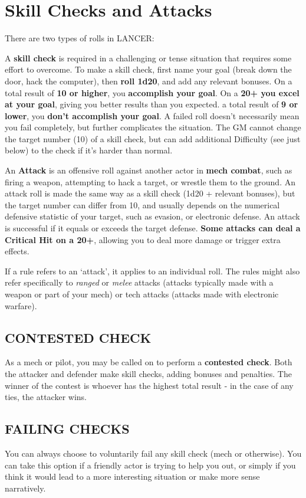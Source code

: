 \section{Skill Checks and Attacks}

There are two types of rolls in LANCER:

A \textbf{skill check} is required in a challenging or tense situation that requires some effort to
overcome. To make a skill check, first name your goal (break down the door, hack the computer),
then \textbf{roll 1d20}, and add any relevant bonuses. On a total result of \textbf{10 or higher}, you \textbf{accomplish
your goal}. On a \textbf{20+ you excel at your goal}, giving you better results than you expected. a total
result of \textbf{9 or lower}, you \textbf{don’t accomplish your goal}. A failed roll doesn’t necessarily mean you
fail completely, but further complicates the situation. The GM cannot change the target number
(10) of a skill check, but can add additional Difficulty (see just below) to the check if it’s harder
than normal.

An \textbf{Attack} is an offensive roll against another actor in \textbf{mech combat}, such as firing a weapon,
attempting to hack a target, or wrestle them to the ground. An attack roll is made the same way
as a skill check (1d20 + relevant bonuses), but the target number can differ from 10, and usually
depends on the numerical defensive statistic of your target, such as evasion, or electronic
defense. An attack is successful if it equals or exceeds the target defense. \textbf{Some attacks can
deal a Critical Hit on a 20+}, allowing you to deal more damage or trigger extra effects.

If a rule refers to an ‘attack’, it applies to an individual roll. The rules might also refer specifically
to \textit{ranged} or \textit{melee} attacks (attacks typically made with a weapon or part of your mech) or tech
attacks (attacks made with electronic warfare).

\subsection*{CONTESTED CHECK}

As a mech or pilot, you may be called on to perform a \textbf{contested check}. Both the attacker and
defender make skill checks, adding bonuses and penalties. The winner of the contest is whoever
has the highest total result - in the case of any ties, the attacker wins.

\subsection*{FAILING CHECKS}

You can always choose to voluntarily fail any skill check (mech or otherwise). You can take this
option if a friendly actor is trying to help you out, or simply if you think it would lead to a more
interesting situation or make more sense narratively.
